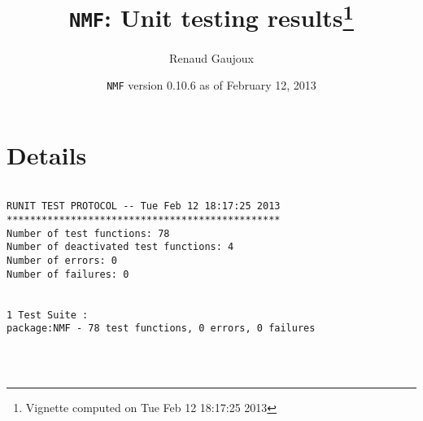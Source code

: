 \documentclass[10pt]{article}
\author{Renaud Gaujoux}
\title{\texttt{NMF}: Unit testing results\footnote{Vignette computed  on Tue Feb 12 18:17:25 2013}}
\date{\texttt{NMF} version 0.10.6 as of February 12, 2013}
\begin{document}
\maketitle

\section{Details}
\begin{verbatim}

RUNIT TEST PROTOCOL -- Tue Feb 12 18:17:25 2013 
*********************************************** 
Number of test functions: 78 
Number of deactivated test functions: 4 
Number of errors: 0 
Number of failures: 0 

 
1 Test Suite : 
package:NMF - 78 test functions, 0 errors, 0 failures




\end{verbatim}
\end{document}
